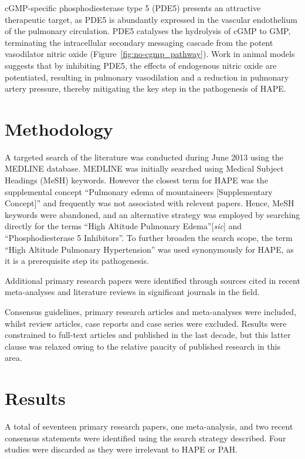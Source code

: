 \documentclass[10pt,a4paper]{article}
\begin{document}
cGMP-specific phosphodiesterase type 5 (PDE5) presents an attractive therapeutic target, as PDE5 is abundantly expressed in the vascular endothelium of the pulmonary circulation.\cite{Ahn:1991vt} PDE5 catalyses the hydrolysis of cGMP to GMP, terminating the intracellular secondary messaging cascade from the potent vasodilator nitric oxide (Figure~\ref{fig:no-cgmp_pathway}).\cite{Archer:2009cx} Work in animal models suggests that by inhibiting PDE5, the effects of endogenous nitric oxide are potentiated, resulting in pulmonary vasodilation and a reduction in pulmonary artery pressure, thereby mitigating the key step in the pathogenesis of HAPE.\cite{Zhao:2001kj}

\section*{Methodology}

A targeted search of the literature was conducted during June 2013 using the MEDLINE database. MEDLINE was initially searched using Medical Subject Headings (MeSH) keywords. However the closest term for HAPE was the supplemental concept ``Pulmonary edema of mountaineers [Supplementary Concept]'' and frequently was not associated with relevent papers. Hence, MeSH keywords were abandoned, and an alternative strategy was employed by searching directly for the terms ``High Altitude Pulmonary Edema''[\emph{sic}] and ``Phosphodiesterase 5 Inhibitors''. To further broaden the search scope, the term ``High Altitude Pulmonary Hypertension'' was used synonymously for HAPE, as it is a prerequisite step its pathogenesis.

Additional primary research papers were identified through sources cited in recent meta-analyses and literature reviews in significant journals in the field.

Consensus guidelines, primary research articles and meta-analyses were included, whilst review articles, case reports and case series were excluded. Results were constrained to full-text articles and published in the last decade, but this latter clause was relaxed owing to the relative paucity of published research in this area.

\section*{Results}

A total of seventeen primary research papers, one meta-analysis, and two recent consensus statements were identified using the search strategy described. Four studies were discarded as they were irrelevant to HAPE or PAH.
\end{document}
